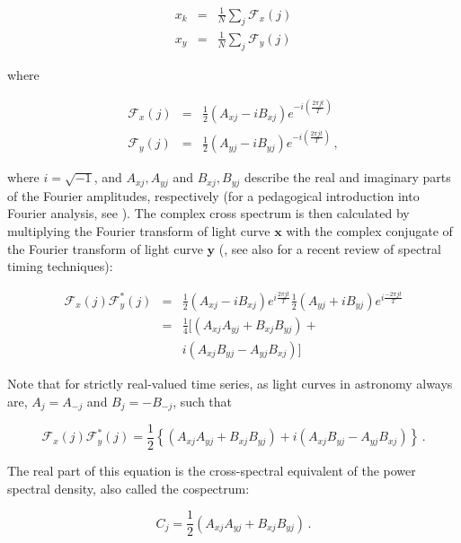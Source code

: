 \documentclass[12pt]{emulateapj}
\begin{document}
\begin{eqnarray}
x_k & = & \frac{1}{N} \sum_{j}{\mathcal{F}_x(j)} \nonumber \\
x_y & = & \frac{1}{N} \sum_{j}{\mathcal{F}_y(j)}
\end{eqnarray}

\noindent where

\begin{eqnarray}
\mathcal{F}_x(j) &= & \frac{1}{2} (A_{xj} - i B_{xj}) e^{-i\left( \frac{2 \pi j t}{T} \right)} \\
\mathcal{F}_y(j) &= & \frac{1}{2} (A_{yj} - i B_{yj}) e^{-i\left( \frac{2 \pi j t}{T} \right)} \, ,
\end{eqnarray}

\noindent where $i = \sqrt{-1}$, and $A_{xj}, A_{yj}$ and $B_{xj}, B_{yj}$ describe the real and imaginary parts of the Fourier amplitudes, respectively (for a pedagogical introduction into Fourier analysis, see \citealt{vanderklis1989}). The complex cross spectrum is then calculated by multiplying the Fourier transform of light curve $\mathbf{x}$ with the complex conjugate of the Fourier transform of light curve $\mathbf{y}$ (\citealt{vaughan1997,nowak1999}, see also \citealt{uttley2014} for a recent review of spectral timing techniques):

\begin{eqnarray}
\mathcal{F}_x(j) \mathcal{F}_y^*(j) & = & \frac{1}{2} (A_{xj} - i B_{xj}) e^{i \frac{2 \pi j t}{T}} \frac{1}{2} (A_{yj} + i B_{yj}) e^{i \frac{-2 \pi j t}{T}}\nonumber \\ 
		     & = & \frac{1}{4} [ (A_{xj}A_{yj} + B_{xj}B_{yj}) + \\\nonumber
		     & &  i (A_{xj}B_{yj} - A_{yj}B_{xj}) ]
\end{eqnarray}

Note that for strictly real-valued time series, as light curves in astronomy always are, $A_j = A_{-j}$ and $B_j = - B_{-j}$, such that 

\begin{equation}
\mathcal{F}_x(j) \mathcal{F}_y^*(j) = \frac{1}{2} \left\{ (A_{xj}A_{yj} + B_{xj}B_{yj}) + i (A_{xj}B_{yj} - A_{yj}B_{xj}) \right\} \, .
\end{equation}

\noindent The real part of this equation is the cross-spectral equivalent of the power spectral density, also called the cospectrum:

\begin{equation}
C_j = \frac{1}{2}  (A_{xj}A_{yj} + B_{xj}B_{yj}) \, .
\end{equation}
\end{document}
